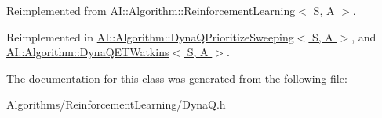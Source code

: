 Reimplemented from \hyperlink{classAI_1_1Algorithm_1_1ReinforcementLearning_a25d7fa245a79e61061436dc0f1db90cb}{A\-I\-::\-Algorithm\-::\-Reinforcement\-Learning$<$ S, A $>$}.



Reimplemented in \hyperlink{classAI_1_1Algorithm_1_1DynaQPrioritizeSweeping_ad08b55f3cf927189dd31abf9fc1c2959}{A\-I\-::\-Algorithm\-::\-Dyna\-Q\-Prioritize\-Sweeping$<$ S, A $>$}, and \hyperlink{classAI_1_1Algorithm_1_1DynaQETWatkins_aa4e40af0fd705cd5d1f7fd13834c57c6}{A\-I\-::\-Algorithm\-::\-Dyna\-Q\-E\-T\-Watkins$<$ S, A $>$}.



The documentation for this class was generated from the following file\-:\begin{DoxyCompactItemize}
\item 
Algorithms/\-Reinforcement\-Learning/Dyna\-Q.\-h\end{DoxyCompactItemize}
